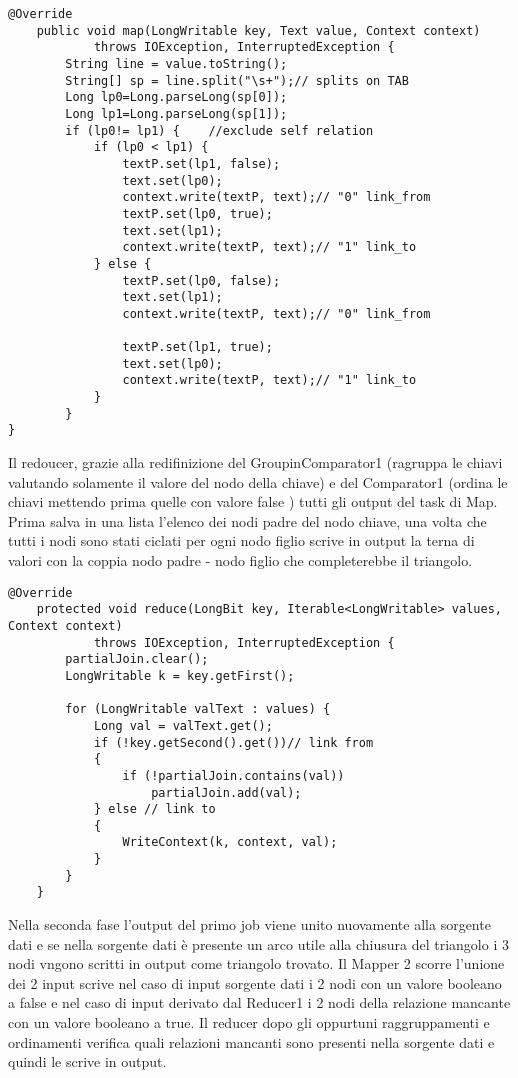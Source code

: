 \documentclass[paper=a4, fontsize=11pt]{scrartcl}	%
\numberwithin{equation}{section}															%
\numberwithin{figure}{section}																%
\numberwithin{table}{section}																%
\begin{document}
\begin{lstlisting}[label=Mapper1,caption=Implementazione del Mapper1]
@Override
	public void map(LongWritable key, Text value, Context context)
			throws IOException, InterruptedException {
		String line = value.toString();
		String[] sp = line.split("\s+");// splits on TAB
		Long lp0=Long.parseLong(sp[0]);
		Long lp1=Long.parseLong(sp[1]);
		if (lp0!= lp1) { 	//exclude self relation
			if (lp0 < lp1) {
				textP.set(lp1, false);
				text.set(lp0);
				context.write(textP, text);// "0" link_from
				textP.set(lp0, true);
				text.set(lp1);
				context.write(textP, text);// "1" link_to
			} else {
				textP.set(lp0, false);
				text.set(lp1);
				context.write(textP, text);// "0" link_from

				textP.set(lp1, true);
				text.set(lp0);
				context.write(textP, text);// "1" link_to
			}
		}
}\end{lstlisting}
Il redoucer, grazie alla redifinizione del GroupinComparator1 (ragruppa le chiavi valutando solamente il valore del nodo della chiave) e  del Comparator1 (ordina le chiavi mettendo prima quelle con valore false ) tutti gli output del task di Map. Prima salva in una lista l'elenco dei nodi padre del nodo chiave, una volta che tutti i nodi sono stati ciclati per ogni nodo figlio scrive in output la terna di valori con la coppia nodo padre - nodo figlio che completerebbe il triangolo.
\begin{lstlisting}[label=Reducer1,caption=Implementazione del Reducer1]	
	@Override
	protected void reduce(LongBit key, Iterable<LongWritable> values, Context context)
			throws IOException, InterruptedException {
		partialJoin.clear();
		LongWritable k = key.getFirst();

		for (LongWritable valText : values) {
			Long val = valText.get();
			if (!key.getSecond().get())// link from
			{
				if (!partialJoin.contains(val))
					partialJoin.add(val);
			} else // link to
			{
				WriteContext(k, context, val);
			}
		}
	}
\end{lstlisting}

Nella seconda fase l'output del primo job viene unito nuovamente alla sorgente dati e se nella sorgente dati è presente un arco utile alla chiusura del triangolo i 3 nodi vngono scritti in output come triangolo trovato.
Il Mapper 2 scorre l'unione dei 2 input scrive nel caso di input sorgente dati i 2 nodi con un valore booleano a false e nel caso di input derivato dal Reducer1 i 2 nodi della relazione mancante con un valore booleano a true. Il reducer dopo gli oppurtuni raggruppamenti e ordinamenti verifica quali relazioni mancanti sono presenti nella sorgente dati e quindi le scrive in output.
\end{document}
